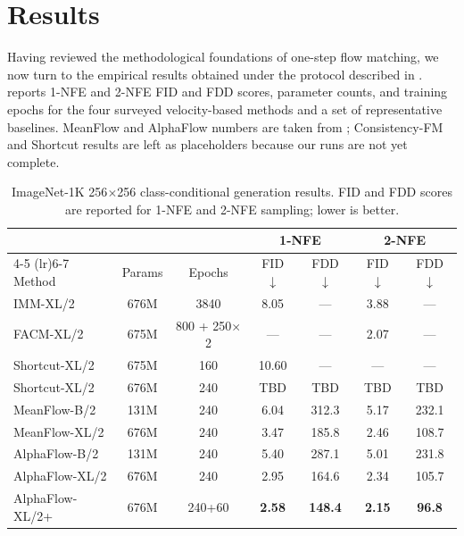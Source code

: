 \section{Results}
\label{sec:results}

Having reviewed the methodological foundations of one-step flow matching, we now turn to the empirical results obtained under the protocol described in .  reports 1-NFE and 2-NFE FID and FDD scores, parameter counts, and training epochs for the four surveyed velocity-based methods and a set of representative baselines. MeanFlow and AlphaFlow numbers are taken from \citet{zhang2025alphaflow}; Consistency-FM and Shortcut results are left as placeholders because our runs are not yet complete.

\begin{table}[htbp]
  \centering
  \small
  \caption{ImageNet-1K 256$\times$256 class-conditional generation results. FID and FDD scores are reported for 1-NFE and 2-NFE sampling; lower is better.}
  \label{tab:imagenet-results}
  \begin{tabular}{@{}lcc cc cc@{}}
    \toprule
    & & & \multicolumn{2}{c}{1-NFE} & \multicolumn{2}{c}{2-NFE} \\
    \cmidrule(lr){4-5} \cmidrule(lr){6-7}
    Method & Params & Epochs & FID $\downarrow$ & FDD $\downarrow$ & FID $\downarrow$ & FDD $\downarrow$ \\
    \midrule
    IMM-XL/2 & 676M & 3840 & 8.05 & --- & 3.88 & --- \\
    FACM-XL/2 & 675M & 800 + 250$\times$2 & --- & --- & 2.07 & --- \\
    \midrule
    Shortcut-XL/2 & 675M & 160 & 10.60 & --- & --- & --- \\
    Shortcut-XL/2 & 676M & 240 & TBD & TBD & TBD & TBD \\
    \midrule
    MeanFlow-B/2 & 131M & 240 & 6.04 & 312.3 & 5.17 & 232.1 \\
    MeanFlow-XL/2 & 676M & 240 & 3.47 & 185.8 & 2.46 & 108.7 \\
    \midrule
    AlphaFlow-B/2 & 131M & 240 & 5.40 & 287.1 & 5.01 & 231.8 \\
    AlphaFlow-XL/2 & 676M & 240 & 2.95 & 164.6 & 2.34 & 105.7 \\
    AlphaFlow-XL/2+ & 676M & 240+60 & \textbf{2.58} & \textbf{148.4} & \textbf{2.15} & \textbf{96.8} \\
    \bottomrule
  \end{tabular}
\end{table}

